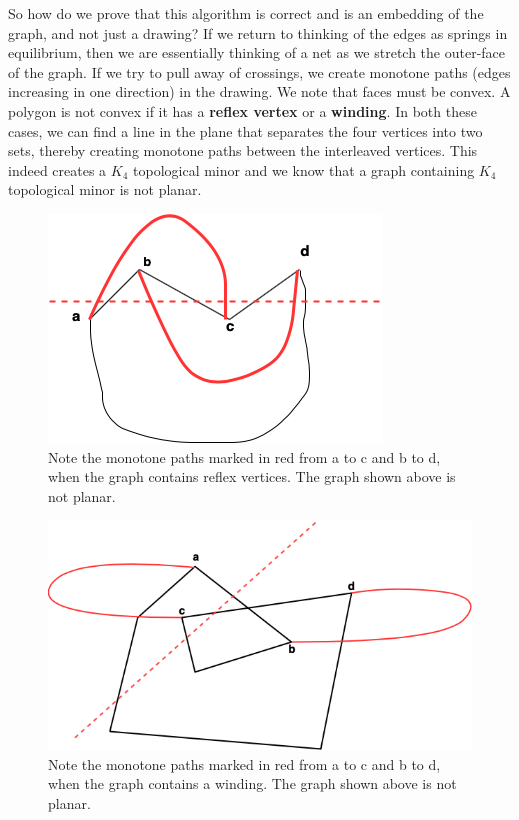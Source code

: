 \documentclass{article}
\begin{document}
    \medskip \noindent So how do we prove that this algorithm is correct and is an embedding of the graph, and not just a drawing? If we return to thinking of the edges as springs in equilibrium, then we are essentially thinking of a net as we stretch the outer-face of the graph. If we try to pull away of crossings, we create monotone paths (edges increasing in one direction) in the drawing. We note that faces must be convex. A polygon is not convex if it has a \textbf{reflex vertex} or a \textbf{winding}. In both these cases, we can find a line in the plane that separates the four vertices into two sets, thereby creating monotone paths between the interleaved vertices. This indeed creates a $K_4$ topological minor and we know that a graph containing $K_4$ topological minor is not planar.
  
    \begin{figure}[H]
    \centering
    \includegraphics[scale=0.5]{Images/monotone_paths_in_reflex_vertices.png}
    \caption{Note the monotone paths marked in red from a to c and b to d, when the graph contains reflex vertices. The graph shown above is not planar.}
    \label{fig:my_label}
    \end{figure}
   
    \begin{figure}[H]
    \centering
    \includegraphics[scale=0.5]{Images/winding_polygon.png}
    \caption{Note the monotone paths marked in red from a to c and b to d, when the graph contains a winding. The graph shown above is not planar.}
    \label{fig:my_label}
    \end{figure}
\end{document}
